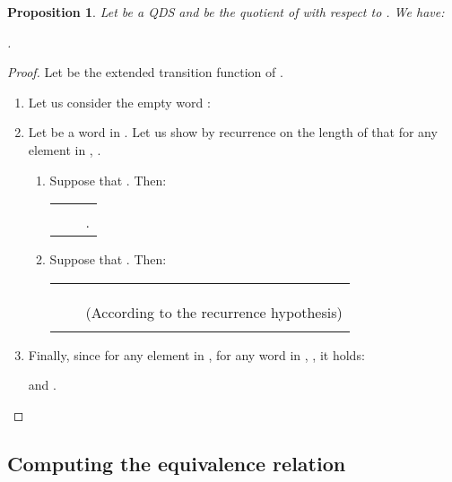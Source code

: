 \documentclass[11pt]{elsarticle}
\newtheorem{proposition}{Proposition}
\newcommand\modif[2]{{#2}}
\begin{document}
\begin{proposition}\label{prop rightinv pres lang}
  Let  be a QDS and    be the quotient of  with respect to . We have:
  
  \centerline{
    .
  }
\end{proposition}
\begin{proof}
Let  be the extended transition function of .
  \begin{enumerate}
    \item Let us consider the empty word :
  
  \centerline{
               \modif{  }{}    
  }
  
  \item Let  be a word in . Let us show by recurrence on the length of  that for any element  in ,   .
  
   \begin{enumerate}
     \item Suppose that . Then:
  
\begin{tabular}{ll@{\ }l}
         &
         &   
          \\
       &   &  .\\
    \end{tabular}


 \item Suppose that . Then: 

    \begin{tabular}{l@{\ }l@{\ }l}
       
      &   & \\
      &  &  \\
      &  &  \\
      & & (According to  \modif{}{the} recurrence hypothesis)\\
      &  & \\
    \end{tabular}
\end{enumerate}
  
  \item Finally, since for any element  in , for any word  in ,   , it holds:
  
  \centerline{
       and .
  }
  \end{enumerate}
  
\end{proof}



\subsection{Computing the equivalence relation }
\end{document}
